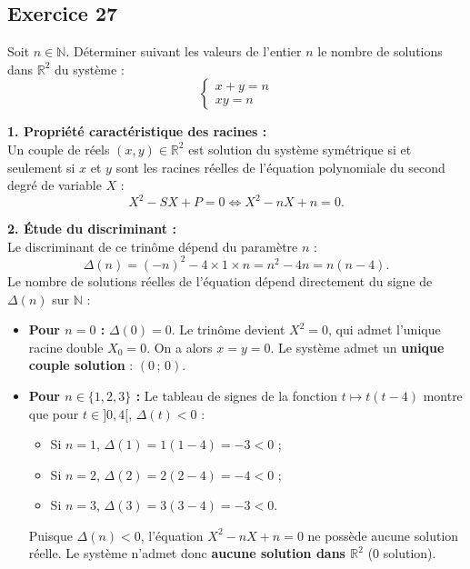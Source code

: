 \documentclass[11pt,a4paper]{article}
\begin{document}
\subsection*{Exercice 27}
Soit $n \in \mathbb{N}$. Déterminer suivant les valeurs de l'entier $n$ le nombre de solutions dans $\mathbb{R}^2$ du système :
\[
\begin{cases}
x + y = n \\
xy = n
\end{cases}
\]

\begin{correctionbox}
\textbf{1. Propriété caractéristique des racines :}\\
Un couple de réels $(x, y) \in \mathbb{R}^2$ est solution du système symétrique si et seulement si $x$ et $y$ sont les racines réelles de l'équation polynomiale du second degré de variable $X$ :
\[
X^2 - SX + P = 0 \iff X^2 - nX + n = 0.
\]

\textbf{2. Étude du discriminant :}\\
Le discriminant de ce trinôme dépend du paramètre $n$ :
\[
\Delta(n) = (-n)^2 - 4 \times 1 \times n = n^2 - 4n = n(n - 4).
\]
Le nombre de solutions réelles de l'équation dépend directement du signe de $\Delta(n)$ sur $\mathbb{N}$ :

\begin{itemize}[leftmargin=*,label=\textbullet]
    \item \textbf{Pour $n = 0$ :}
    $\Delta(0) = 0$. Le trinôme devient $X^2 = 0$, qui admet l'unique racine double $X_0 = 0$.
    On a alors $x = y = 0$.
    Le système admet un \textbf{unique couple solution} : $(0\,;\,0)$.

    \item \textbf{Pour $n \in \{1, 2, 3\}$ :}
    Le tableau de signes de la fonction $t \mapsto t(t-4)$ montre que pour $t \in ]0, 4[$, $\Delta(t) < 0$ :
    \begin{itemize}
        \item Si $n = 1$, $\Delta(1) = 1(1 - 4) = -3 < 0$ ;
        \item Si $n = 2$, $\Delta(2) = 2(2 - 4) = -4 < 0$ ;
        \item Si $n = 3$, $\Delta(3) = 3(3 - 4) = -3 < 0$.
    \end{itemize}
    Puisque $\Delta(n) < 0$, l'équation $X^2 - nX + n = 0$ ne possède aucune solution réelle.
    Le système n'admet donc \textbf{aucune solution dans $\mathbb{R}^2$} ($0$ solution).


\end{itemize}
\end{correctionbox}
\end{document}
